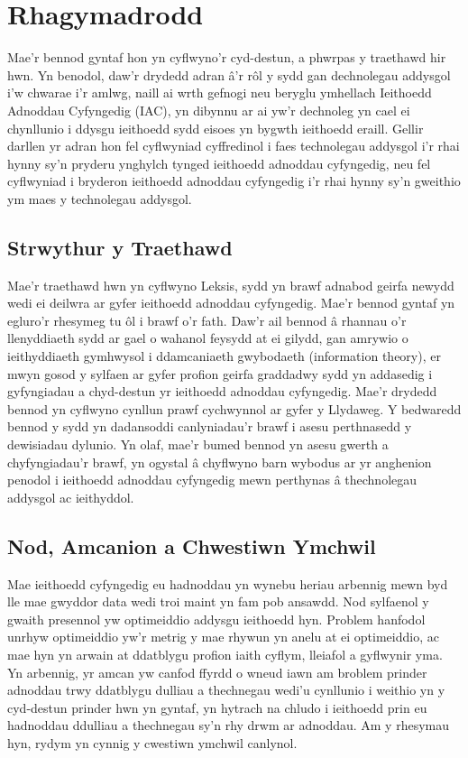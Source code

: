 \chapter{Rhagymadrodd}    
Mae'r bennod gyntaf hon yn cyflwyno'r cyd-destun, a phwrpas y traethawd hir hwn. Yn benodol, daw'r drydedd adran â'r rôl y sydd gan dechnolegau addysgol i'w chwarae i'r amlwg, naill ai wrth gefnogi neu beryglu ymhellach Ieithoedd Adnoddau Cyfyngedig (IAC), yn dibynnu ar ai yw'r dechnoleg yn cael ei chynllunio i ddysgu ieithoedd sydd eisoes yn bygwth ieithoedd eraill. Gellir darllen yr adran hon fel cyflwyniad cyffredinol i faes technolegau addysgol i'r rhai hynny sy'n pryderu ynghylch tynged ieithoedd adnoddau cyfyngedig, neu fel cyflwyniad i bryderon ieithoedd adnoddau cyfyngedig i'r rhai hynny sy'n gweithio ym maes y technolegau addysgol.

\section{Strwythur y Traethawd}
Mae'r traethawd hwn yn cyflwyno Leksis, sydd yn brawf adnabod geirfa newydd wedi ei deilwra ar gyfer ieithoedd adnoddau cyfyngedig. Mae'r bennod gyntaf yn egluro'r rhesymeg tu ôl i brawf o'r fath. Daw'r ail bennod â rhannau o'r llenyddiaeth sydd ar gael o wahanol feysydd at ei gilydd, gan amrywio o ieithyddiaeth gymhwysol i ddamcaniaeth gwybodaeth (information theory), er mwyn gosod y sylfaen ar gyfer profion geirfa graddadwy sydd yn addasedig i gyfyngiadau a chyd-destun yr ieithoedd adnoddau cyfyngedig. Mae'r drydedd bennod yn cyflwyno cynllun prawf cychwynnol ar gyfer y Llydaweg. Y bedwaredd bennod y sydd yn dadansoddi canlyniadau'r brawf i asesu perthnasedd y dewisiadau dylunio. Yn olaf, mae'r bumed bennod yn asesu gwerth a chyfyngiadau'r brawf, yn ogystal â chyflwyno barn wybodus ar yr anghenion penodol i ieithoedd adnoddau cyfyngedig mewn perthynas â thechnolegau addysgol ac ieithyddol.

\section{Nod, Amcanion a Chwestiwn Ymchwil}
Mae ieithoedd cyfyngedig eu hadnoddau yn wynebu heriau arbennig mewn byd lle mae gwyddor data wedi troi maint yn fam pob ansawdd. Nod sylfaenol y gwaith presennol yw optimeiddio addysgu ieithoedd hyn. Problem hanfodol unrhyw optimeiddio yw'r metrig y mae rhywun yn anelu at ei optimeiddio, ac mae hyn yn arwain at ddatblygu profion iaith cyflym, lleiafol a gyflwynir yma. Yn arbennig, yr amcan yw canfod ffyrdd o wneud iawn am broblem prinder adnoddau trwy ddatblygu dulliau a thechnegau wedi'u cynllunio i weithio yn y cyd-destun prinder hwn yn gyntaf, yn hytrach na chludo i ieithoedd prin eu hadnoddau ddulliau a thechnegau sy'n rhy drwm ar adnoddau. Am y rhesymau hyn, rydym yn cynnig y cwestiwn ymchwil canlynol.

